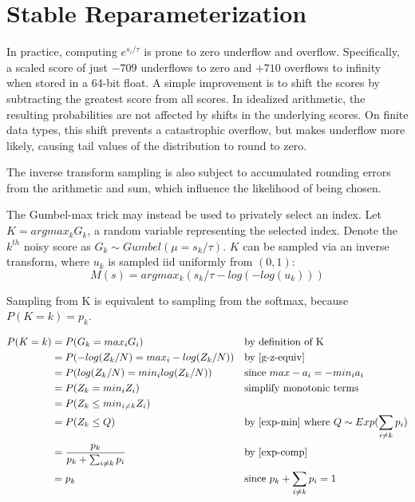 \documentclass{article}
\begin{document}
\section{Stable Reparameterization}

In practice, computing $e^{s_i / \tau}$ is prone to zero underflow and overflow. 
Specifically, a scaled score of just $-709$ underflows to zero and $+710$ overflows to infinity when stored in a 64-bit float. 
A simple improvement is to shift the scores by subtracting the greatest score from all scores.
In idealized arithmetic, the resulting probabilities are not affected by shifts in the underlying scores.
On finite data types, this shift prevents a catastrophic overflow, but makes underflow more likely, 
causing tail values of the distribution to round to zero. 

The inverse transform sampling is also subject to accumulated rounding errors from the arithmetic and sum, 
which influence the likelihood of being chosen.

The Gumbel-max trick may instead be used to privately select an index.
Let $K = argmax_k G_k$, a random variable representing the selected index. 
Denote the $k^{th}$ noisy score as $G_k \sim Gumbel(\mu = s_k / \tau)$.
$K$ can be sampled via an inverse transform, where $u_k$ is sampled iid uniformly from $(0, 1)$:
\begin{equation}
    M(s) = argmax_k (s_k / \tau - log(-log(u_k)))
\end{equation}

\begin{theorem}
Sampling from K is equivalent to sampling from the softmax, because $P(K=k) = p_k$. \cite{Medina2020DuffAD}
\end{theorem}
\begin{align*}
    P(K = k) &= P(G_k = max_i G_i) &&\text{by definition of K} \\
    &= P(-log(Z_k / N) = max_i -log(Z_k / N)) &&\text{by \ref{g-z-equiv}}\\
    &= P(log(Z_k / N) = min_i log(Z_k / N)) &&\text{since } max -a_i = -min_i a_i \\
    &= P(Z_k = min_i Z_i) &&\text{simplify monotonic terms} \\
    &= P(Z_k \leq min_{i \neq k} Z_i) \\
    &= P(Z_k \leq Q) &&\text{by \ref{exp-min} where } Q \sim Exp(\sum_{i \neq k} p_i)\\
    &= \frac{p_k}{p_k + \sum_{i \neq k} p_i}  &&\text{by \ref{exp-comp}} \\
    &= p_k &&\text{since } p_k + \sum_{i \neq k} p_i = 1
\end{align*}
\end{document}
